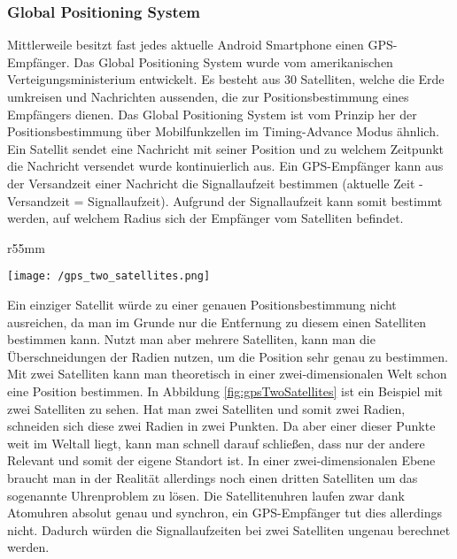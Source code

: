\subsubsection{Global Positioning System}
Mittlerweile besitzt fast jedes aktuelle Android Smartphone einen GPS-Empfänger. 
Das Global Positioning System wurde vom amerikanischen Verteigungsministerium entwickelt. Es besteht aus 30 Satelliten, welche die Erde umkreisen und Nachrichten aussenden, die zur Positionsbestimmung eines Empfängers dienen. Das Global Positioning System ist vom Prinzip her der Positionsbestimmung über Mobilfunkzellen im Timing-Advance Modus ähnlich. 
Ein Satellit sendet eine Nachricht mit seiner Position und zu welchem Zeitpunkt die Nachricht versendet wurde kontinuierlich aus.
Ein GPS-Empfänger kann aus der Versandzeit einer Nachricht die Signallaufzeit bestimmen (aktuelle Zeit - Versandzeit = Signallaufzeit). Aufgrund der Signallaufzeit kann somit bestimmt werden, auf welchem Radius sich der Empfänger vom Satelliten befindet. 
\begin{wrapfigure}{r}{55mm}
\centering
   \begin{center}
   	\texttt{[image: /gps\_two\_satellites.png]} 
   \end{center}
   \caption[Lokalisierung: GPS 2 Satelliten]{GPS 2 Satelliten}
   \label{fig:gpsTwoSatellites}
\end{wrapfigure}
Ein einziger Satellit würde zu einer genauen Positionsbestimmung nicht ausreichen, da man im Grunde nur die Entfernung zu diesem einen Satelliten bestimmen kann. Nutzt man aber mehrere Satelliten, kann man die Überschneidungen der Radien nutzen, um die Position sehr genau zu bestimmen. Mit zwei Satelliten kann man theoretisch in einer zwei-dimensionalen Welt schon eine Position bestimmen. In Abbildung \ref{fig:gpsTwoSatellites} ist ein Beispiel mit zwei Satelliten zu sehen. Hat man zwei Satelliten und somit zwei Radien, schneiden sich diese zwei Radien in zwei Punkten. Da aber einer dieser Punkte weit im Weltall liegt, kann man schnell darauf schließen, dass nur der andere Relevant und somit der eigene Standort ist. In einer zwei-dimensionalen Ebene braucht man in der Realität allerdings noch einen dritten Satelliten um das sogenannte Uhrenproblem zu lösen. Die Satellitenuhren laufen zwar dank Atomuhren absolut genau und synchron, ein GPS-Empfänger tut dies allerdings nicht. Dadurch würden die Signallaufzeiten bei zwei Satelliten ungenau berechnet werden. 

